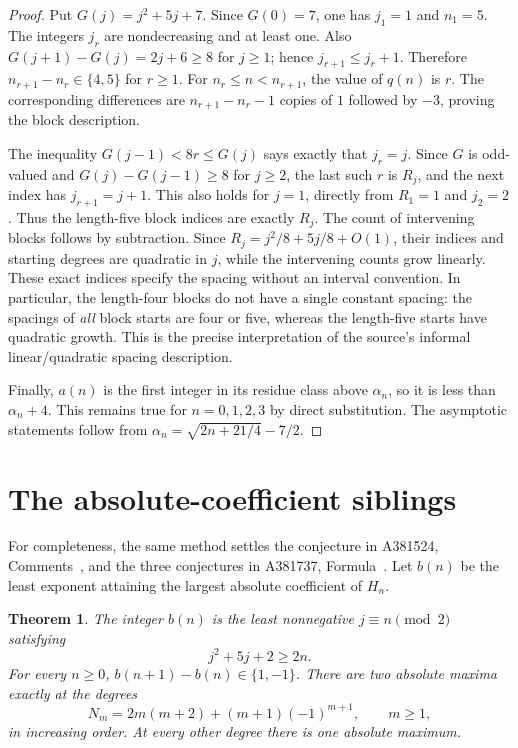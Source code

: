 \documentclass[11pt]{article}
\newtheorem{theorem}{Theorem}
\begin{document}
\begin{proof}
Put $G(j)=j^2+5j+7$. Since $G(0)=7$, one has $j_1=1$ and $n_1=5$.
The integers $j_r$ are nondecreasing and at least one. Also
$G(j+1)-G(j)=2j+6\geq8$ for $j\geq1$; hence
$j_{r+1}\leq j_r+1$. Therefore $n_{r+1}-n_r\in\{4,5\}$ for $r\geq1$.
For $n_r\leq n<n_{r+1}$, the value of $q(n)$ is $r$.
The corresponding differences are $n_{r+1}-n_r-1$ copies of $1$
followed by $-3$, proving the block description.

The inequality $G(j-1)<8r\leq G(j)$ says exactly that $j_r=j$.
Since $G$ is odd-valued and $G(j)-G(j-1)\geq8$ for $j\geq2$,
the last such $r$ is $R_j$, and the next index has $j_{r+1}=j+1$.
This also holds for $j=1$, directly from $R_1=1$ and $j_2=2$.
Thus the length-five block indices are exactly $R_j$.
The count of intervening blocks follows by subtraction.
Since $R_j=j^2/8+5j/8+O(1)$, their indices and starting degrees
are quadratic in $j$, while the intervening counts grow linearly.
These exact indices specify the spacing without an interval convention.
In particular, the length-four blocks do not have a single constant spacing:
the spacings of \emph{all} block starts are four or five, whereas the
length-five starts have quadratic growth. This is the precise interpretation
of the source's informal linear/quadratic spacing description.

Finally, $a(n)$ is the first integer in its residue class above $\alpha_n$,
so it is less than $\alpha_n+4$. This remains true for $n=0,1,2,3$
by direct substitution. The asymptotic statements follow from
$\alpha_n=\sqrt{2n+21/4}-7/2$.
\end{proof}

\section{The absolute-coefficient siblings}
For completeness, the same method settles the conjecture in A381524,
Comments~\cite{absolute}, and the three conjectures in A381737,
Formula~\cite{ties}. Let $b(n)$ be the least exponent attaining the
largest absolute coefficient of $H_n$.

\begin{theorem}\label{thm:absolute}
The integer $b(n)$ is the least nonnegative $j\equiv n\pmod2$ satisfying
\begin{equation}\label{eq:absolute}
 j^2+5j+2\geq2n.
\end{equation}
For every $n\geq0$, $b(n+1)-b(n)\in\{1,-1\}$.
There are two absolute maxima exactly at the degrees
\begin{equation}\label{eq:ties}
 N_m=2m(m+2)+(m+1)(-1)^{m+1},\qquad m\geq1,
\end{equation}
in increasing order. At every other degree there is one absolute maximum.
\end{theorem}
\end{document}
